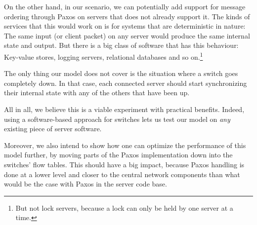 On the other hand, in our scenario, we can potentially add support for
message ordering through Paxos on servers that does not already support it.
The kinds of services that this would work on is for systems that are
deterministic in nature: The same input (or client packet) on any server
would produce the same internal state and output.
%
But there is a big class of software that has this behaviour:  Key-value
stores, logging servers, relational databases and so on.\footnote{But not
lock servers, because a lock can only be held by one server at a time.}

The only thing our model does not cover is the situation where a switch goes
completely down.  In that case, each connected server should start
synchronizing their internal state with any of the others that have been up.

All in all, we believe this is a viable experiment with practical benefits.
Indeed, using a software-based approach for switches lets us test our model
on \textit{any} existing piece of server software.

Moreover, we also intend to show how one can optimize the performance of
this model further, by moving parts of the Paxos implementation down into
the switches' flow tables.  This should have a big impact, because Paxos
handling is done at a lower level and closer to the central network
components than what would be the case with Paxos in the server code base.


